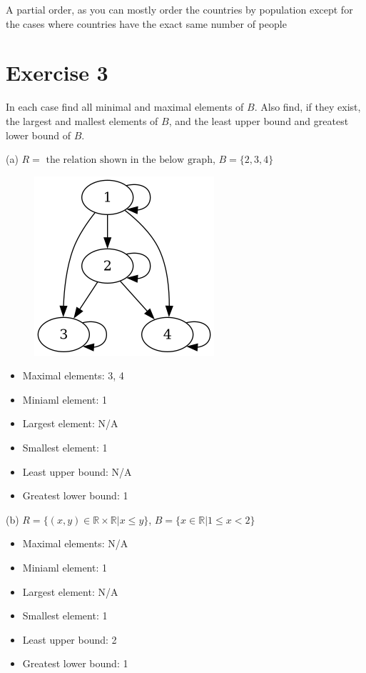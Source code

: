 \documentclass[11pt]{article}
\begin{document}
A partial order, as you can mostly order the countries by population except for 
the cases where countries have the exact same number of people 

\section*{Exercise 3}

In each case find all minimal and maximal elements of $B$. Also find, if they 
exist, the largest and mallest elements of $B$, and the least upper bound and
greatest lower bound of $B$.

\noindent (a) $R = \text{ the relation shown in the below graph}$, $B = \{2,3,4\}$

\begin{figure}[H]
\includegraphics[height=0.25\textheight]{4_4_images/4_4_3a.png}
\end{figure}


\begin{itemize}
    \item Maximal elements: 3, 4
    \item Miniaml element: 1
    \item Largest element: N/A 
    \item Smallest element: 1
    \item Least upper bound: N/A 
    \item Greatest lower bound: 1
\end{itemize}

\noindent (b) $R = \{(x,y) \in \mathbb{R} \times \mathbb{R} | x \leq y\}$,
$B = \{x \in \mathbb{R} | 1 \leq x < 2\}$

\begin{itemize}
    \item Maximal elements: N/A
    \item Miniaml element: 1
    \item Largest element: N/A 
    \item Smallest element: 1
    \item Least upper bound: 2
    \item Greatest lower bound: 1
\end{itemize}
\end{document}
